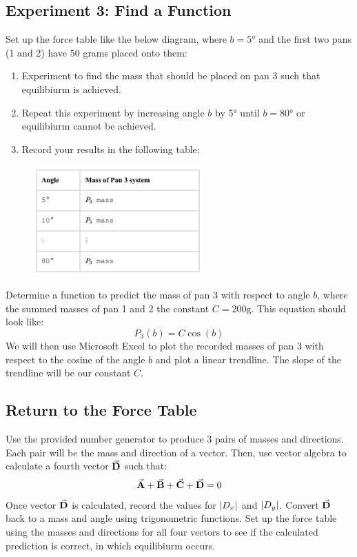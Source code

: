 \documentclass{article}
\begin{document}
\subsection{Experiment 3: Find a Function}
Set up the force table like the below diagram, where $b=\ang{5}$ and the first two pans
(1 and 2) have 50 grams placed onto them:
\begin{figure}[H]
    \centering
\end{figure}

\begin{enumerate}
    \item Experiment to find the mass that should be placed on pan 3 
    such that equilibiurm is achieved.
    \item Repeat this experiment by increasing angle $b$ by \ang{5} until 
    $b=\ang{80}$ or equilibiurm cannot be achieved.
    \item Record your results in the following table:
\end{enumerate}
\begin{figure}[H]
    \centering
    \includegraphics[width=6.5cm]{lab2_example_table.png} 
\end{figure}
Determine a function to predict the mass of pan 3 with respect to angle $b$, where the 
summed masses of pan 1 and 2 the constant $C=200\mathrm{g}$. This equation should look like:
\[ P_3(b) = C\cos(b) \]
We will then use Microsoft Excel to plot the recorded masses of pan 3 with respect to the cosine of 
the angle $b$ and plot a linear trendline. The slope of the trendline will be our constant 
$C$.

\subsection{Return to the Force Table}
Use the provided number generator to produce 3 pairs of masses and directions. Each 
pair will be the mass and direction of a vector. Then, use vector algebra to calculate 
a fourth vector $\va{D}$ such that:
\[ \va{A} + \va{B} + \va{C} + \va{D} = 0 \]
Once vector $\va{D}$ is calculated, record the values for $\abs{D_x}$ and $\abs{D_y}$.
Convert $\va{D}$ back to a mass and angle using trigonometric functions. Set up the force 
table using the masses and directions for all four vectors to see if the calculated prediction 
is correct, in which equilibiurm occurs.
\end{document}
